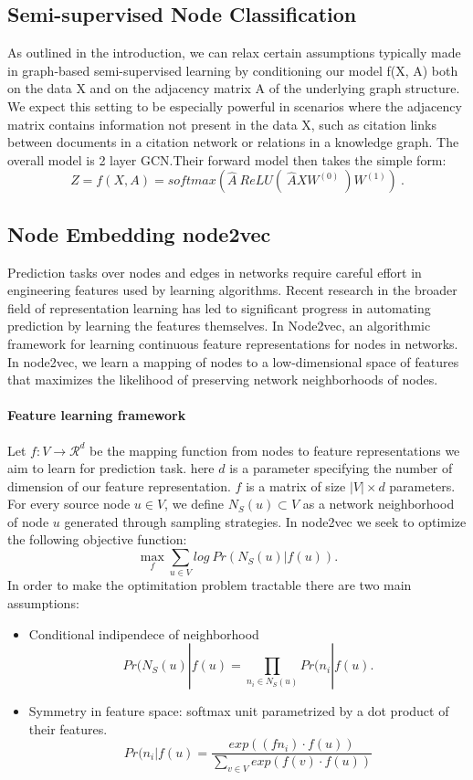 \documentclass{report}
\begin{document}
\subsection{Semi-supervised Node Classification}
As outlined in the introduction,
we can relax certain assumptions typically made in graph-based semi-supervised learning
by conditioning our model f(X, A) both on the data X and on the adjacency matrix A of the
underlying graph structure. We expect this setting to be especially powerful in scenarios where the
adjacency matrix contains information not present in the data X, such as citation links between documents
in a citation network or relations in a knowledge graph. The overall model is 2 layer GCN.Their forward model then takes the simple form:
\[
Z = f(X,A) = softmax(\hat{A}\ ReLU(\ \hat{A}XW^{(0)}\ )W^{(1)})\ .
\]

\subsection{Node Embedding node2vec}
Prediction tasks over nodes and edges in networks require careful
effort in engineering features used by learning algorithms. Recent
research in the broader field of representation learning has led to
significant progress in automating prediction by learning the features
themselves. In \cite{n2v} Node2vec, an algorithmic framework for learning
continuous feature representations for nodes in networks. In
node2vec, we learn a mapping of nodes to a low-dimensional space
of features that maximizes the likelihood of preserving network
neighborhoods of nodes.
\paragraph{Feature learning framework}
Let $f: V \rightarrow \mathcal{R}^d$ be the mapping function from nodes to feature representations we aim to learn for prediction task. here $d$ is a parameter specifying the number of dimension of our feature representation. $f$ is a matrix of size $|V| \times d$ parameters. For every source node $u \in V$, we define $N_S(u) \subset V$ as a network neighborhood of node $u$ generated through sampling strategies. In node2vec we seek to optimize the following objective function:
\[
\max_{f} \sum_{u \in V} log\ Pr(N_S(u)|f(u)).
\]
In order to make the optimitation problem tractable there are two main assumptions:
\begin{itemize}
\item Conditional indipendece of neighborhood
\[
Pr(N_S(u)|f(u) =  \prod_{n_i \in N_S(u)} Pr(n_i|f(u). 
\]
\item Symmetry in feature space: softmax unit parametrized by a dot product of their features.
\[
 Pr(n_i|f(u) = \dfrac{exp((fn_i) \cdot f(u))}{\sum_{v \in V} exp(f(v) \cdot f(u))}
\]

\end{itemize}
 
\end{document}
